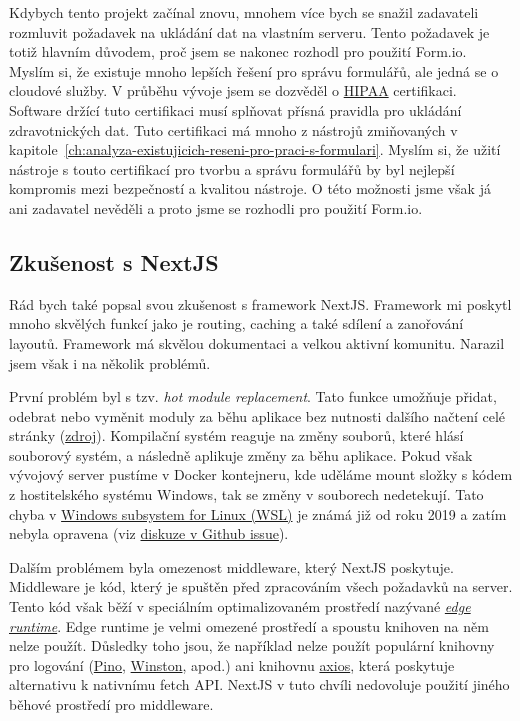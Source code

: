 Kdybych tento projekt začínal znovu, mnohem více bych se snažil zadavateli rozmluvit požadavek na ukládání dat na vlastním serveru.
Tento požadavek je totiž hlavním důvodem, proč jsem se nakonec rozhodl pro použití Form.io.
Myslím si, že existuje mnoho lepších řešení pro správu formulářů, ale jedná se o cloudové služby.
V průběhu vývoje jsem se dozvěděl o \href{https://www.hhs.gov/hipaa/index.html}{HIPAA} certifikaci.
Software držící tuto certifikaci musí splňovat přísná pravidla pro ukládání zdravotnických dat.
Tuto certifikaci má mnoho z nástrojů zmiňovaných v kapitole~\ref{ch:analyza-existujicich-reseni-pro-praci-s-formulari}.
Myslím si, že užití nástroje s touto certifikací pro tvorbu a správu formulářů by byl nejlepší kompromis mezi bezpečností a kvalitou nástroje.
O této možnosti jsme však já ani zadavatel nevěděli a proto jsme se rozhodli pro použití Form.io.

\subsection{Zkušenost s NextJS}\label{subsec:zkusenost-s-nextjs}

Rád bych také popsal svou zkušenost s framework NextJS\@.
Framework mi poskytl mnoho skvělých funkcí jako je routing, caching a také sdílení a zanořování layoutů.
Framework má skvělou dokumentaci a velkou aktivní komunitu.
Narazil jsem však i na několik problémů.

První problém byl s tzv. \textit{hot module replacement}.
Tato funkce umožňuje přidat, odebrat nebo vyměnit moduly za běhu aplikace bez nutnosti dalšího načtení celé stránky (\href{https://webpack.js.org/concepts/hot-module-replacement/}{zdroj}).
Kompilační systém reaguje na změny souborů, které hlásí souborový systém, a následně aplikuje změny za běhu aplikace.
Pokud však vývojový server pustíme v Docker kontejneru, kde uděláme mount složky s kódem z hostitelského systému Windows, tak se změny v souborech nedetekují.
Tato chyba v \href{https://learn.microsoft.com/en-us/windows/wsl/about}{Windows subsystem for Linux (WSL)} je známá již od roku 2019 a zatím nebyla opravena (viz \href{https://github.com/microsoft/WSL/issues/4739}{diskuze v Github issue}).

Dalším problémem byla omezenost middleware, který NextJS poskytuje.
Middleware je kód, který je spuštěn před zpracováním všech požadavků na server.
Tento kód však běží v speciálním optimalizovaném prostředí nazývané \textit{\href{https://edge-runtime.vercel.app/}{edge runtime}}.
Edge runtime je velmi omezené prostředí a spoustu knihoven na něm nelze použít.
Důsledky toho jsou, že například nelze použít populární knihovny pro logování (\href{https://github.com/pinojs/pino}{Pino}, \href{https://github.com/winstonjs/winston}{Winston}, apod.) ani knihovnu \href{https://github.com/axios/axios}{axios}, která poskytuje alternativu k nativnímu fetch API\@.
NextJS v tuto chvíli nedovoluje použití jiného běhové prostředí pro middleware.

